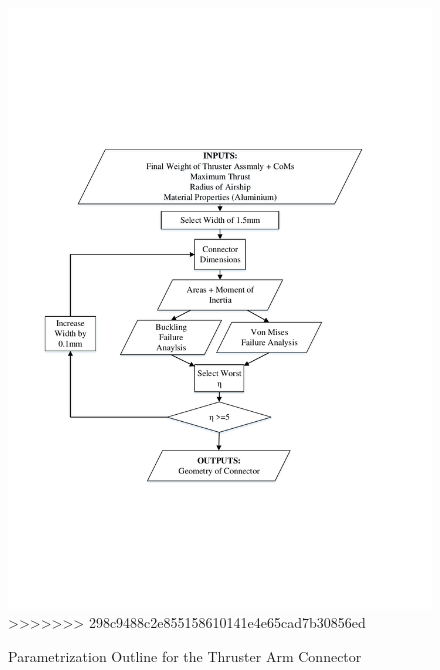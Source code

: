 \documentclass[../main.tex]{subfiles}
\begin{document}
\begin{figure}[H]
	\includegraphics[width=.9\linewidth]{img/paramaterization/connector.pdf}
>>>>>>> 298c9488c2e855158610141e4e65cad7b30856ed
	\caption{Parametrization Outline for the Thruster Arm Connector}
	\label{fig:connectorParametrization}
\end{figure}
\end{document}
